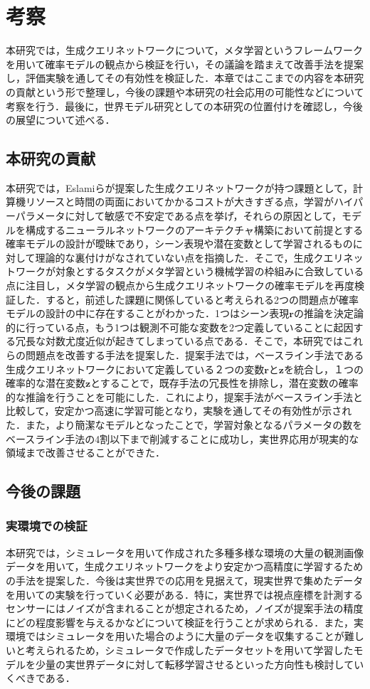 \chapter{考察}
\label{chap:discussion}

本研究では，生成クエリネットワークについて，メタ学習というフレームワークを用いて確率モデルの観点から検証を行い，その議論を踏まえて改善手法を提案し，評価実験を通してその有効性を検証した．本章ではここまでの内容を本研究の貢献という形で整理し，今後の課題や本研究の社会応用の可能性などについて考察を行う．最後に，世界モデル研究としての本研究の位置付けを確認し，今後の展望について述べる．

\section{本研究の貢献}
本研究では，Eslamiらが提案した生成クエリネットワークが持つ課題として，計算機リソースと時間の両面においてかかるコストが大きすぎる点，学習がハイパーパラメータに対して敏感で不安定である点を挙げ，それらの原因として，モデルを構成するニューラルネットワークのアーキテクチャ構築において前提とする確率モデルの設計が曖昧であり，シーン表現や潜在変数として学習されるものに対して理論的な裏付けがなされていない点を指摘した．そこで，生成クエリネットワークが対象とするタスクがメタ学習という機械学習の枠組みに合致している点に注目し，メタ学習の観点から生成クエリネットワークの確率モデルを再度検証した．すると，前述した課題に関係していると考えられる2つの問題点が確率モデルの設計の中に存在することがわかった．1つはシーン表現$\bm{r}$の推論を決定論的に行っている点，もう1つは観測不可能な変数を2つ定義していることに起因する冗長な対数尤度近似が起きてしまっている点である．そこで，本研究ではこれらの問題点を改善する手法を提案した．提案手法では，ベースライン手法である生成クエリネットワークにおいて定義している２つの変数$\bm{r}$と$\bm{z}$を統合し，１つの確率的な潜在変数$\bm{z}$とすることで，既存手法の冗長性を排除し，潜在変数の確率的な推論を行うことを可能にした．これにより，提案手法がベースライン手法と比較して，安定かつ高速に学習可能となり，実験を通してその有効性が示された．また，より簡潔なモデルとなったことで，学習対象となるパラメータの数をベースライン手法の4割以下まで削減することに成功し，実世界応用が現実的な領域まで改善させることができた．

\section{今後の課題}
\subsection{実環境での検証}
本研究では，シミュレータを用いて作成された多種多様な環境の大量の観測画像データを用いて，生成クエリネットワークをより安定かつ高精度に学習するための手法を提案した．今後は実世界での応用を見据えて，現実世界で集めたデータを用いての実験を行っていく必要がある．特に，実世界では視点座標を計測するセンサーにはノイズが含まれることが想定されるため，ノイズが提案手法の精度にどの程度影響を与えるかなどについて検証を行うことが求められる．また，実環境ではシミュレータを用いた場合のように大量のデータを収集することが難しいと考えられるため，シミュレータで作成したデータセットを用いて学習したモデルを少量の実世界データに対して転移学習させるといった方向性も検討していくべきである．

